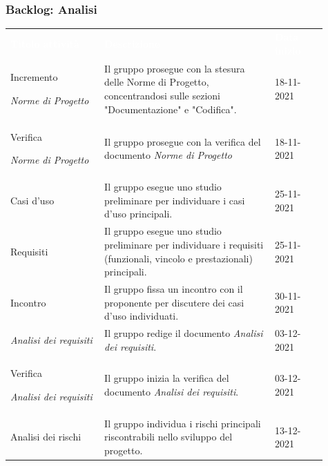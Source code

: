 \subsubsection{Backlog: Analisi}
{\renewcommand{\arraystretch}{1.5}
\begin{longtable}{p{0.27\linewidth}p{0.49\linewidth}p{0.15\linewidth}}
	\rowcolor[RGB]{33, 73, 50}
	\textcolor{white}{\textbf{Titolo attività}} & \textcolor{white}{\textbf{Descrizione}} & \textcolor{white}{\textbf{Data inizio}}\\
    
    \rowcolor[RGB]{216, 235, 171}
    Incremento \par \textit{Norme di Progetto} & Il gruppo prosegue con la stesura delle Norme di Progetto, concentrandosi sulle sezioni "Documentazione" e "Codifica". & 18-11-2021\\

    \rowcolor[RGB]{233, 245, 206}
    Verifica \par \textit{Norme di Progetto} & Il gruppo prosegue con la verifica del documento \textit{Norme di Progetto} & 18-11-2021\\
    
    \rowcolor[RGB]{216, 235, 171}
    Casi d'uso & Il gruppo esegue uno studio preliminare per individuare i casi d'uso principali. & 25-11-2021\\

    \rowcolor[RGB]{233, 245, 206}
    Requisiti & Il gruppo esegue uno studio preliminare per individuare i requisiti (funzionali, vincolo e prestazionali) principali. & 25-11-2021\\

    \rowcolor[RGB]{216, 235, 171}
    Incontro & Il gruppo fissa un incontro con il proponente per discutere dei casi d'uso individuati. & 30-11-2021\\ 
    
    \rowcolor[RGB]{233, 245, 206}
    \textit{Analisi dei requisiti} & Il gruppo redige il documento \textit{Analisi dei requisiti}. & 03-12-2021\\

    \rowcolor[RGB]{216, 235, 171}
    Verifica \par \textit{Analisi dei requisiti} & Il gruppo inizia la verifica del documento \textit{Analisi dei requisiti}. & 03-12-2021\\

    \rowcolor[RGB]{233, 245, 206}
    Analisi dei rischi & Il gruppo individua i rischi principali riscontrabili nello sviluppo del progetto. & 13-12-2021\\


\end{longtable}}

